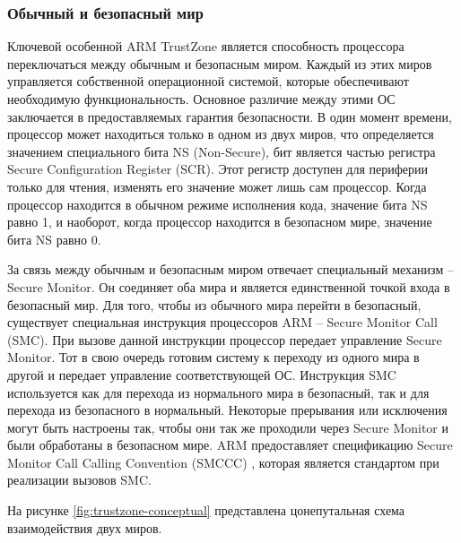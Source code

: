 \subsubsection{Обычный и безопасный мир}

Ключевой особенной ARM TrustZone является способность процессора переключаться между обычным и безопасным миром. Каждый из этих миров управляется собственной операционной системой, которые обеспечивают необходимую функциональность. Основное различие между этими ОС заключается в предоставляемых гарантия безопасности. В один момент времени, процессор может находиться только в одном из двух миров, что определяется значением специального бита NS (Non-Secure), бит является частью регистра Secure Configuration Register (SCR). Этот регистр доступен для периферии только для чтения, изменять его значение может лишь сам процессор. Когда процессор находится в обычном режиме исполнения кода, значение бита NS равно 1, и наоборот, когда процессор находится в безопасном мире, значение бита NS равно 0.

За связь между обычным и безопасным миром отвечает специальный механизм -- Secure Monitor. Он соединяет оба мира и является единственной точкой входа в безопасный мир. Для того, чтобы из обычного мира перейти в безопасный, существует специальная инструкция процессоров ARM -- Secure Monitor Call (SMC). При вызове данной инструкции процессор передает управление Secure Monitor. Тот в свою очередь готовим систему к переходу из одного мира в другой и передает управление соответствующей ОС. Инструкция SMC используется как для перехода из нормального мира в безопасный, так и для перехода из безопасного в нормальный. Некоторые прерывания или исключения могут быть настроены так, чтобы они так же проходили через Secure Monitor и были обработаны в безопасном мире. ARM предоставляет спецификацию Secure Monitor Call Calling Convention (SMCCC) \cite{smccc}, которая является стандартом при реализации вызовов SMC. 

На рисунке \ref{fig:trustzone-conceptual} представлена цонепутальная схема взаимодействия двух миров.

